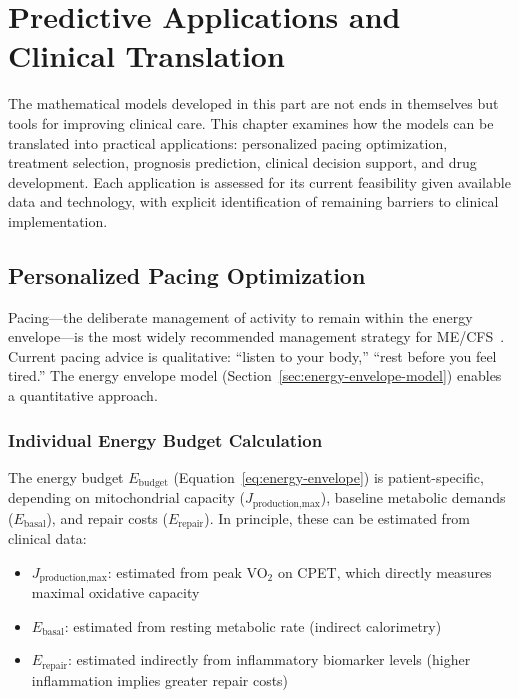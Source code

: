 \chapter{Predictive Applications and Clinical Translation}
\label{ch:predictive-applications}

The mathematical models developed in this part are not ends in themselves but tools for improving clinical care. This chapter examines how the models can be translated into practical applications: personalized pacing optimization, treatment selection, prognosis prediction, clinical decision support, and drug development. Each application is assessed for its current feasibility given available data and technology, with explicit identification of remaining barriers to clinical implementation.



\section{Personalized Pacing Optimization}
\label{sec:pacing-optimization}

Pacing---the deliberate management of activity to remain within the energy envelope---is the most widely recommended management strategy for ME/CFS~\cite{jason2012energy,jason2009energy}. Current pacing advice is qualitative: ``listen to your body,'' ``rest before you feel tired.'' The energy envelope model (Section~\ref{sec:energy-envelope-model}) enables a quantitative approach.

\subsection{Individual Energy Budget Calculation}

The energy budget $E_{\text{budget}}$ (Equation~\ref{eq:energy-envelope}) is patient-specific, depending on mitochondrial capacity ($J_{\text{production,max}}$), baseline metabolic demands ($E_{\text{basal}}$), and repair costs ($E_{\text{repair}}$). In principle, these can be estimated from clinical data:

\begin{itemize}
    \item $J_{\text{production,max}}$: estimated from peak VO$_2$ on CPET, which directly measures maximal oxidative capacity~\cite{keller2024cpet}
    \item $E_{\text{basal}}$: estimated from resting metabolic rate (indirect calorimetry)
    \item $E_{\text{repair}}$: estimated indirectly from inflammatory biomarker levels (higher inflammation implies greater repair costs)
\end{itemize}

